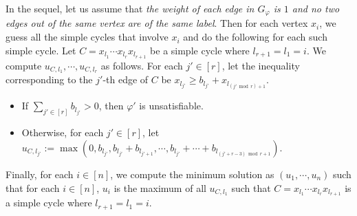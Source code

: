 \documentclass[runningheads]{llncs}
\begin{document}
In the sequel, let us assume that \emph{the weight of each edge in $G_\varphi$ is $1$ and no two edges out of the same vertex are of the same label}. 
Then for each vertex $x_i$, we guess all the simple cycles that involve $x_i$ and do the following for each such simple cycle.  
Let $C = x_{l_1} \cdots x_{l_r} x_{l_{r+1}}$ be a simple cycle where $l_{r+1} = l_1 = i$. We compute $u_{C, l_1}, \cdots, u_{C, l_r}$ as follows. 
 For each $j' \in [r]$, let the inequality corresponding to the $j'$-th edge of $C$ be $x_{l_{j'}} \ge b_{l_{j'}} + x_{l_{(j' \bmod r)+1}}$. 
%
%
\begin{itemize}
\item If $\sum \limits_{j' \in [r]} b_{l_{j'}} > 0 $, then $\varphi'$ is unsatisfiable. 
%
\item Otherwise, for each $j' \in [r]$, let $u_{C, l_{j'}} := \max(0, b_{l_{j'}}, b_{l_{j'}}+ b_{l_{j'+1}}, \cdots, b_{l_{j'}} + \cdots + b_{l_{(j'+r-3) \bmod r+1}})$.
\end{itemize}
Finally, for each $i \in [n]$, we compute the minimum solution as $(u_1, \cdots, u_n)$ such that for each $i \in [n]$, $u_i$ is the maximum of all $u_{C, l_1}$ such that $C = x_{l_1} \cdots x_{l_r} x_{l_{r+1}}$ is a simple cycle where $l_{r+1} = l_1 = i$. 
\end{document}
